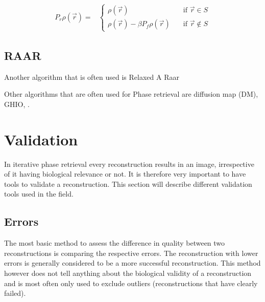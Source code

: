 \begin{align}
P_r \rho\left(\vec{r}\right) =& \begin{cases} \rho\left(\vec{r}\right) \quad &\mathrm{if}\,\,
    \vec{r} \in S\\\rho(\vec{r}) -\beta P_f \rho(\vec{r}) \quad & \mathrm{if}\,\, \vec{r} \not\in S \end{cases}
\end{align}
 

\subsection{RAAR}
Another algorithm that is often used is Relaxed A
Raar 

Other algorithms that are often used for Phase retrieval are diffusion map (DM), GHIO, .

\section{Validation}
In iterative phase retrieval every reconstruction results in an image, irrespective of it having biological relevance or not. It is therefore very important to have tools to validate a reconstruction. This section will describe different validation tools used in the field.

\subsection{Errors}
The most basic method to assess the difference in quality between two reconstructions is comparing the respective errors. The reconstruction with lower errors is generally considered to be a more successful reconstruction. This method however does not tell anything about the biological validity of a reconstruction and is most often only used to exclude outliers (reconstructions that have clearly failed).
 
